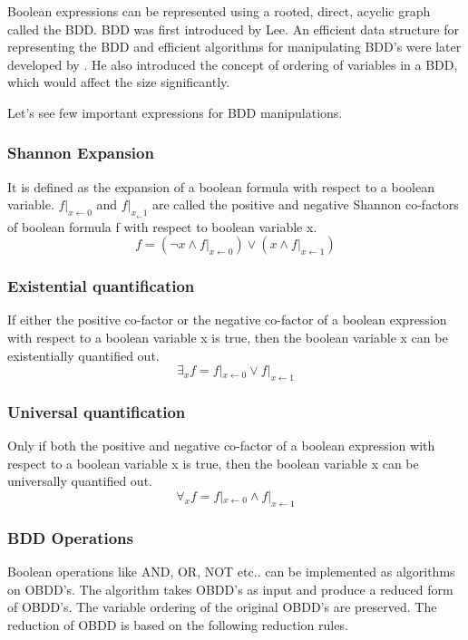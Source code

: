 Boolean expressions can be represented using a rooted, direct, acyclic graph called the BDD. BDD was first introduced by Lee\cite{Lee,1959}. An efficient data structure for representing the BDD and efficient algorithms for manipulating BDD's were later developed by \cite{Bryant 1986}. He also introduced the concept of ordering of variables in a BDD, which would affect the size significantly. 

Let's see few important expressions for BDD manipulations.

\subsubsection*{Shannon Expansion}
It is defined as the expansion of a boolean formula with respect to a boolean variable. $f|_{x\leftarrow 0}$ and $f|_{x_\leftarrow 1}$ are called the positive and negative Shannon co-factors of  boolean formula f with respect to boolean variable x.
\begin{equation}
\label{shannon}
f=(\neg x\land f|_{x\leftarrow 0}) \lor (x\land f|_{x\leftarrow 1})
\end{equation}

\subsubsection*{Existential quantification}
If either the positive co-factor or the negative co-factor of a boolean expression with respect to a boolean variable x is true, then the boolean variable x can be existentially quantified out.
\begin{equation}
\label{eqn:EQ}
\exists_xf=f|_{x\leftarrow 0} \lor f|_{x\leftarrow 1}
\end{equation}


\subsubsection*{Universal quantification}
Only if both the positive and negative co-factor of a boolean expression with respect to a boolean variable x is true, then the boolean variable x can be universally quantified out. 
\begin{equation}
\label{UQ}
\forall_xf=f|_{x\leftarrow 0} \land f|_{x\leftarrow 1}
\end{equation}

\subsubsection*{BDD Operations}
Boolean operations like AND, OR, NOT etc.. can be implemented as algorithms on OBDD's. The algorithm takes OBDD's as input and produce a reduced form of OBDD's\cite{Bryant 1986}. The variable ordering of the original OBDD's are preserved. The reduction of OBDD is based on the following reduction rules.

